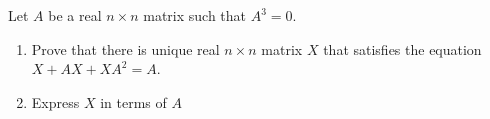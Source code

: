 Let \(A\) be a real \(n\times n\) matrix such that \(A^3=0\).
\begin{enumerate}[label = (\alph*)]
	\item Prove that there is unique real \(n\times n\) matrix \(X\) that satisfies the equation \(X+AX+XA^2=A\).
	\item Express \(X\) in terms of \(A\)
\end{enumerate}
